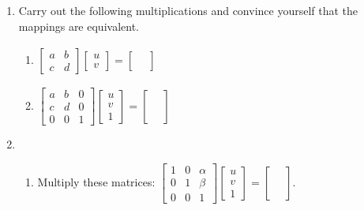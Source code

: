 \documentclass[../gatm.tex]{subfiles}
\begin{document}
\begin{enumerate}
\setcounter{enumi}{\value{mp_problem_i}}
\item Carry out the following multiplications and convince yourself that the mappings are equivalent.\begin{multicols}{2}
\begin{enumerate}
\item $\left[\begin{array}{cc}a & b \\ c & d\end{array}\right]\left[\begin{array}{c} u \\ v \end{array}\right]=\left[\begin{array}{c} \phantom{u} \\ \phantom{v} \end{array}\right]$ $\phantom{\begin{array}{c}u \\ v \\ 1 \end{array}}$
\item $\left[\begin{array}{ccc}a & b & 0 \\ c & d & 0 \\ 0 & 0 & 1 \end{array}\right]\left[\begin{array}{c}u \\ v \\ 1 \end{array}\right] = \left[\begin{array}{c}\phantom{u} \\ \phantom{v} \\ \phantom{1} \end{array}\right]$
\end{enumerate}
\end{multicols}
\item \begin{enumerate}
\item Multiply these matrices: $\left[\begin{array}{ccc} 1 & 0 & \alpha \\ 0 & 1 & \beta \\ 0 & 0 & 1 \end{array}\right]\left[\begin{array}{c}u \\ v \\ 1 \end{array}\right]=\left[\begin{array}{c}\phantom{u} \\ \phantom{v} \\ \phantom{1}\end{array}\right].$ \label{prob:translation_matrix}

\end{enumerate}
\end{enumerate}
\end{document}
